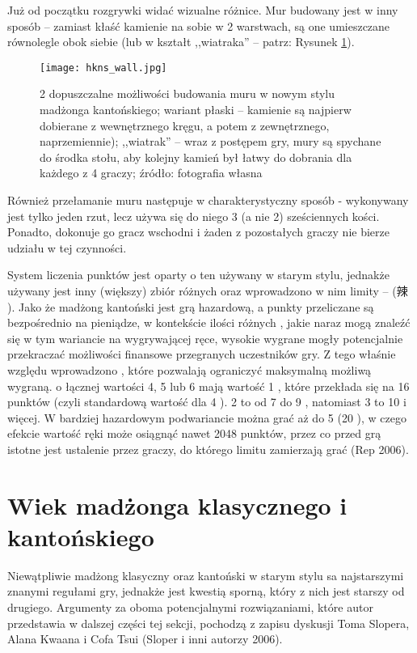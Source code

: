 Już od początku rozgrywki widać wizualne różnice. Mur budowany jest w inny
sposób -- zamiast kłaść kamienie na sobie w 2 warstwach, są one umieszczane
równolegle obok siebie (lub w kształt ,,wiatraka'' -- patrz: Rysunek
\ref{fig:hkns_wall}).

\begin{figure}[H]
  \centering
  \texttt{[image: hkns\_wall.jpg]}
  \caption{2 dopuszczalne możliwości budowania muru w nowym stylu madżonga
  kantońskiego; wariant płaski -- kamienie są najpierw
dobierane z wewnętrznego kręgu, a potem z zewnętrznego, naprzemiennie);
,,wiatrak'' -- wraz z postępem gry, mury są spychane do środka stołu, aby
kolejny kamień był łatwy do dobrania dla każdego z 4 graczy; źródło:
  fotografia własna}
  \label{fig:hkns_wall}
\end{figure}

Również przełamanie muru następuje w charakterystyczny sposób - wykonywany jest
tylko jeden rzut, lecz używa się do niego 3 (a nie 2) sześciennych kości.
Ponadto, dokonuje go gracz wschodni i żaden z pozostałych graczy nie bierze
udziału w tej czynności.

System liczenia punktów jest oparty o ten używany w starym stylu, jednakże
używany jest inny (większy) zbiór różnych  oraz wprowadzono w nim
limity --  (辣 ). Jako że madżong kantoński jest
grą hazardową, a punkty przeliczane są bezpośrednio na pieniądze, w kontekście
ilości różnych , jakie naraz mogą znaleźć się w tym wariancie na
wygrywającej ręce, wysokie wygrane mogły potencjalnie przekraczać możliwości finansowe
przegranych uczestników gry. Z tego właśnie względu wprowadzono ,
które pozwalają ograniczyć maksymalną możliwą wygraną.  o łącznej
wartości 4, 5 lub 6 mają wartość 1 , które przekłada się na 16 punktów
(czyli standardową wartość dla 4 ). 2  to od 7 do 9
, natomiast 3  to 10 i więcej. W bardziej hazardowym
podwariancie można grać aż do 5  (20 ), w czego
efekcie wartość ręki może osiągnąć nawet 2048 punktów, przez co przed grą
istotne jest ustalenie przez graczy, do którego limitu zamierzają grać (Rep 2006).

\section{Wiek madżonga klasycznego i kantońskiego}
\label{ccvshkos}
Niewątpliwie madżong klasyczny oraz kantoński w starym stylu sa najstarszymi
znanymi regułami gry, jednakże jest kwestią sporną, który z nich jest starszy
od drugiego. Argumenty za oboma potencjalnymi rozwiązaniami, które autor
przedstawia w dalszej części tej sekcji, pochodzą z zapisu dyskusji Toma
Slopera, Alana Kwaana i Cofa Tsui (Sloper i inni autorzy 2006).

